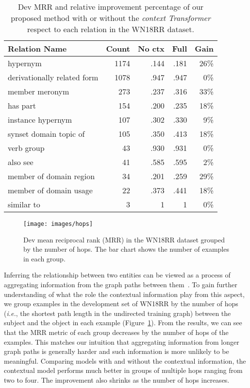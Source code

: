 \documentclass[11pt]{article}
\begin{document}
\begin{table}[tb]
\centering
\setlength{\tabcolsep}{3pt}
\begin{adjustbox}{max width=\linewidth}
\begin{tabular}{lrrrr}
\toprule
Relation Name    & Count & No ctx & Full & Gain \\\midrule
 hypernym & 1174 & .144 & .181 & 26\%\\
 derivationally related form & 1078 & .947 & .947 & 0\%\\
 member meronym & 273 & .237 & .316 & 33\%\\
 has part & 154 & .200 & .235 & 18\%\\
 instance hypernym & 107 & .302 & .330 & 9\%\\
 synset domain topic of & 105 & .350 & .413 & 18\%\\
 verb group & 43 & .930 & .931 & 0\%\\
 also see & 41 & .585 & .595 & 2\%\\
 member of domain region & 34 & .201 & .259 & 29\%\\
 member of domain usage & 22 & .373 & .441 & 18\%\\
 similar to & 3 & 1 & 1 & 0\%\\\bottomrule
\end{tabular}
\end{adjustbox}
\caption{Dev MRR and relative improvement percentage of our proposed method with or without the \emph{context Transformer} respect to each relation in the WN18RR dataset.}
\label{tab:wnrr_type}
\end{table} 

\begin{figure}[t]
  \centering
  \texttt{[image: images/hops]}
  \caption{Dev mean reciprocal rank (MRR) in the WN18RR dataset grouped by the number of hops. The bar chart shows the number of examples in each group.}
  \label{fig:hops}
\end{figure}

Inferring the relationship between two entities can be viewed as a process of aggregating information from the graph paths between them~\cite{teru2019inductive}.
To gain further understanding of what the role the contextual information play from this aspect, we group examples in the development set of WN18RR by the number of hops (\textit{i.e.}, the shortest path length in the undirected training graph) between the subject and the object in each example (Figure~\ref{fig:hops}). From the results, we can see that the MRR metric of each group decreases by the number of hops of the examples.
This matches our intuition that aggregating information from longer graph paths is generally harder and such information is more unlikely to be meaningful.
Comparing models with and without the contextual information, the contextual model performs much better in groups of multiple hops ranging from two to four.
The improvement also shrinks as the number of hops increases.
\end{document}
